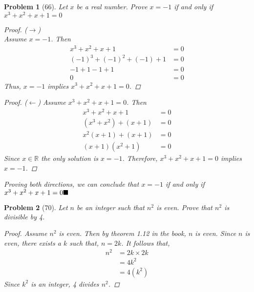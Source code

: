 \documentclass{article}
\theoremstyle{example}
\newtheorem{prob}{Problem}
\renewcommand{\qedsymbol}{$\blacksquare$}
\def\bs{\hspace{\stretch1}\ensuremath\blacksquare}
\begin{document}
\begin{prob}[66]
  Let $x$ be a real number. Prove $x = -1$ if and only if $x^3 + x^2 + x + 1 = 0$
  \renewcommand\qedsymbol{}
  \begin{proof} ($\rightarrow$)\\
    Assume $x = -1$. Then 
    \begin{align*}
      x^3 + x^2 + x + 1          &= 0\\
      (-1)^3 + (-1)^2 + (-1) + 1 &= 0\\
      -1 + 1 -1 + 1              &= 0\\
      0                          &= 0
    \end{align*}
      Thus, $x = -1$ implies $x^3 + x^2 + x + 1 = 0$.
  \end{proof}

  \begin{proof} ($\leftarrow$)
    Assume $x^3 + x^2 + x + 1 = 0$. Then
    \begin{align*}
      x^3 + x^2 + x + 1     &= 0\\
      (x^3 + x^2) + (x + 1) &= 0\\
      x^2(x+1) + (x+1)      &= 0\\
      (x+1)(x^2 + 1)        &= 0
    \end{align*}
    Since $x \in \mathbb{R}$ the only solution is $x = -1$. Therefore, $x^3 + x^2 + x + 1 = 0$ implies $x = -1$.
  \end{proof}
  Proving both directions, we can conclude that $x = -1$ if and only if $x^3 + x^2 + x + 1 = 0 \bs$
\end{prob}
\renewcommand{\qedsymbol}{$\blacksquare$}

 \begin{prob}[70]
   Let $n$ be an integer such that $n^2$ is even. Prove that $n^2$ is divisible by 4.
   \begin{proof}
     Assume $n^2$ is even. Then by theorem 1.12 in the book, $n$ is even. Since $n$ is even, there exists a $k$ such that, $n = 2k$. It follows that,
     \begin{align*}
       n^2 &= 2k \times 2k\\
           &= 4k^2\\
           &= 4(k^2)
     \end{align*}
     Since $k^2$ is an integer, 4 divides $n^2$.
  \end{proof}
\end{prob}
\end{document}
